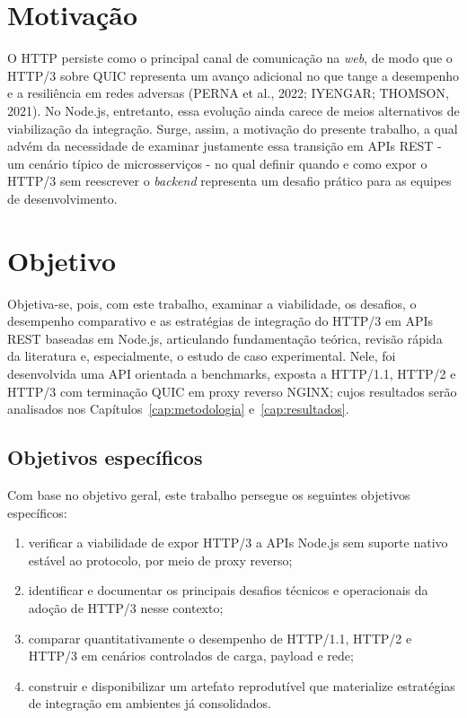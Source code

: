 \section{Motivação}

O HTTP persiste como o principal canal de comunicação na \textit{web}, de modo que o HTTP/3 sobre QUIC representa um avanço adicional no que tange a desempenho e a resiliência em redes adversas (PERNA et al., 2022; IYENGAR; THOMSON, 2021). No Node.js, entretanto, essa evolução ainda carece de meios alternativos de viabilização da integração. Surge, assim, a motivação do presente trabalho, a qual advém da necessidade de examinar justamente essa transição em APIs REST - um cenário típico de microsserviços - no qual definir quando e como expor o HTTP/3 sem reescrever o \textit{backend} representa um desafio prático para as equipes de desenvolvimento.

\section{Objetivo}\label{sec:objetivo}

Objetiva-se, pois, com este trabalho, examinar a viabilidade, os desafios, o desempenho comparativo e as estratégias de integração do HTTP/3 em APIs REST baseadas em Node.js, articulando fundamentação teórica, revisão rápida da literatura e, especialmente, o estudo de caso experimental. Nele, foi desenvolvida uma API orientada a benchmarks, exposta a HTTP/1.1, HTTP/2 e HTTP/3 com terminação QUIC em proxy reverso NGINX; cujos resultados serão analisados nos Capítulos~\ref{cap:metodologia} e~\ref{cap:resultados}.

\subsection{Objetivos específicos}

Com base no objetivo geral, este trabalho persegue os seguintes objetivos específicos:

\begin{enumerate}[label=\alph*)]
\item verificar a viabilidade de expor HTTP/3 a APIs Node.js sem suporte nativo estável ao protocolo, por meio de proxy reverso;
\item identificar e documentar os principais desafios técnicos e operacionais da adoção de HTTP/3 nesse contexto;
\item comparar quantitativamente o desempenho de HTTP/1.1, HTTP/2 e HTTP/3 em cenários controlados de carga, payload e rede;
\item construir e disponibilizar um artefato reprodutível que materialize estratégias de integração em ambientes já consolidados.
\end{enumerate}

